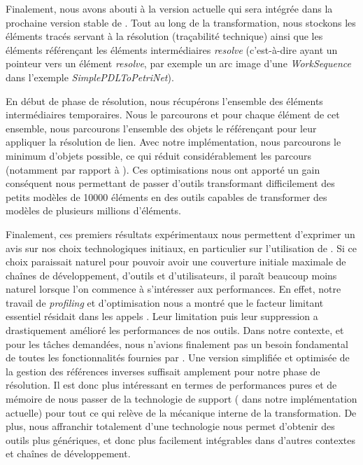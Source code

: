 Finalement, nous avons abouti à la version actuelle qui sera intégrée dans la
prochaine version stable de {\tom}. Tout au long de la transformation, nous
stockons les éléments tracés servant à la résolution (traçabilité technique)
ainsi que les éléments référençant les éléments intermédiaires \emph{resolve}
(c'est-à-dire ayant un pointeur vers un élément \emph{resolve}, par exemple un
arc image d'une \emph{WorkSequence} dans l'exemple
\emph{SimplePDLToPetriNet}). 

En début de phase de résolution, nous récupérons l'ensemble des éléments
intermédiaires temporaires. Nous le parcourons et pour chaque élément de cet
ensemble, nous parcourons l'ensemble des objets le référençant pour leur
appliquer la résolution de lien. Avec notre implémentation, nous parcourons le
minimum d'objets possible, ce qui réduit considérablement les parcours
(notamment par rapport à {\emf}). Ces optimisations nous ont apporté un gain
conséquent nous permettant de passer d'outils transformant difficilement des
petits modèles de \num{10000} éléments en des outils capables de transformer
des modèles de plusieurs millions d'éléments.

Finalement, ces premiers résultats expérimentaux nous permettent d'exprimer un
avis sur nos choix technologiques initiaux, en particulier sur l'utilisation de
{\emf}. Si ce choix paraissait naturel pour pouvoir avoir une couverture
initiale maximale de chaînes de développement, d'outils et d'utilisateurs, il
paraît beaucoup moins naturel lorsque l'on commence à s'intéresser aux
performances. En effet, notre travail de \emph{profiling} et d'optimisation
nous a montré que le facteur limitant essentiel résidait dans les appels
{\emf}. Leur limitation puis leur suppression a drastiquement amélioré les
performances de nos outils. Dans notre contexte, et pour les tâches demandées,
nous n'avions finalement pas un besoin fondamental de toutes les
fonctionnalités fournies par {\emf}. Une version simplifiée et optimisée de la
gestion des références inverses suffisait amplement pour notre phase de
résolution. Il est donc plus intéressant en termes de performances pures et de
mémoire de nous passer de la technologie de support ({\emf} dans notre
implémentation actuelle) pour tout ce qui relève de la mécanique interne de la
transformation. De plus, nous affranchir totalement d'une technologie nous
permet d'obtenir des outils plus génériques, et donc plus facilement
intégrables dans d'autres contextes et chaînes de développement.

